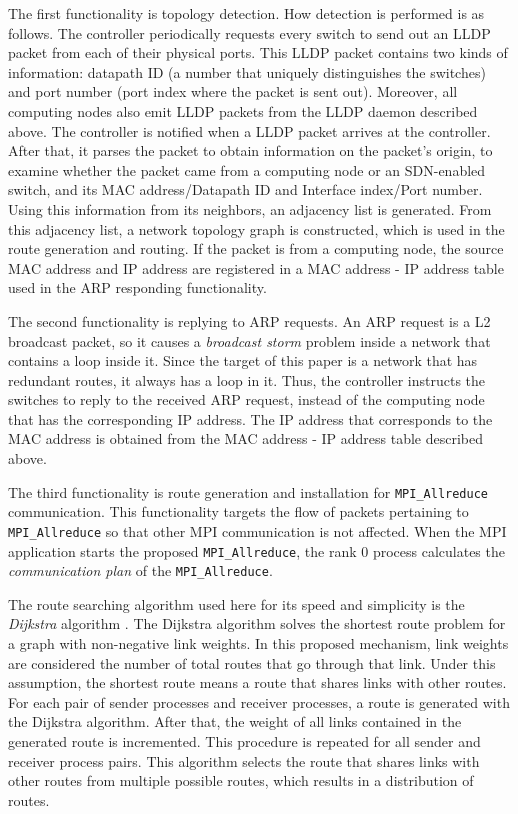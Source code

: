 The first functionality is topology detection. How detection is
performed is as follows. The controller periodically requests every
switch to send out an LLDP packet from each of their physical ports.
This LLDP packet contains two kinds of information: datapath ID (a
number that uniquely distinguishes the switches) and port number (port
index where the packet is sent out). Moreover, all computing nodes also
emit LLDP packets from the LLDP daemon described above. The controller
is notified when a LLDP packet arrives at the controller. After that, it
parses the packet to obtain information on the packet's origin, to
examine whether the packet came from a computing node or an SDN-enabled
switch, and its MAC address/Datapath ID and Interface index/Port number.
Using this information from its neighbors, an adjacency list is
generated. From this adjacency list, a network topology graph is
constructed, which is used in the route generation and routing. If the
packet is from a computing node, the source MAC address and IP address
are registered in a MAC address - IP address table used in the ARP
responding functionality.

The second functionality is replying to ARP requests. An ARP request is
a L2 broadcast packet, so it causes a \emph{broadcast storm} problem
inside a network that contains a loop inside it. Since the target of
this paper is a network that has redundant routes, it always has a loop
in it. Thus, the controller instructs the switches to reply to the
received ARP request, instead of the computing node that has the
corresponding IP address. The IP address that corresponds to the MAC
address is obtained from the MAC address - IP address table described
above.

The third functionality is route generation and installation for
\texttt{MPI\_Allreduce} communication. This functionality targets the
flow of packets pertaining to \texttt{MPI\_Allreduce} so that other MPI
communication is not affected. When the MPI application starts the
proposed \texttt{MPI\_Allreduce}, the rank 0 process calculates the
\emph{communication plan} of the \texttt{MPI\_Allreduce}.

The route searching algorithm used here for its speed and simplicity is
the \emph{Dijkstra} algorithm \cite{Dijkstra1959}. The Dijkstra
algorithm solves the shortest route problem for a graph with
non-negative link weights. In this proposed mechanism, link weights are
considered the number of total routes that go through that link. Under
this assumption, the shortest route means a route that shares links with
other routes. For each pair of sender processes and receiver processes,
a route is generated with the Dijkstra algorithm. After that, the weight
of all links contained in the generated route is incremented. This
procedure is repeated for all sender and receiver process pairs. This
algorithm selects the route that shares links with other routes from
multiple possible routes, which results in a distribution of routes.

